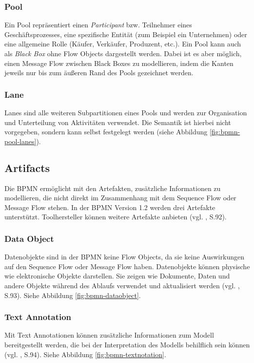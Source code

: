 \subsubsection{Pool}
Ein Pool repräsentiert einen \emph{Participant} bzw. Teilnehmer eines Geschäftsprozesses, eine spezifische Entität (zum Beispiel ein Unternehmen) oder eine allgemeine Rolle (Käufer, Verkäufer, Produzent, etc.). Ein Pool kann auch als \emph{Black Box} ohne Flow Objects dargestellt werden. Dabei ist es aber möglich, einen Message Flow zwischen Black Boxes zu modellieren, indem die Kanten jeweils nur bis zum äußeren Rand des Pools gezeichnet werden.

\subsubsection{Lane}
Lanes sind alle weiteren Subpartitionen eines Pools und werden zur Organisation und Unterteilung von Aktivitäten verwendet. Die Semantik ist hierbei nicht vorgegeben, sondern kann selbst festgelegt werden (siehe Abbildung \ref{fig:bpmn-pool-lanes}).

\subsection{Artifacts}
Die BPMN ermöglicht mit den Artefakten, zusätzliche Informationen zu modellieren, die nicht direkt im Zusammenhang mit dem Sequence Flow oder Message Flow stehen. In der BPMN Version 1.2 werden drei Artefakte unterstützt. Toolhersteller können weitere Artefakte anbieten (vgl. \citep{BPMN2009}, S.92).

\subsubsection{Data Object}
Datenobjekte sind in der BPMN keine Flow Objects, da sie keine Auswirkungen auf den Sequence Flow oder Message Flow haben. Datenobjekte können physische wie elektronische Objekte darstellen. Sie zeigen wie Dokumente, Daten und andere Objekte während des Ablaufs verwendet und aktualisiert werden (vgl. \citep{BPMN2009}, S.93). Siehe Abbildung \ref{fig:bpmn-dataobject}.


\subsubsection{Text Annotation}
Mit Text Annotationen können zusätzliche Informationen zum Modell bereitgestellt werden, die bei der Interpretation des Modells behilflich sein können (vgl. \citep{BPMN2009}, S.94). Siehe Abbildung \ref{fig:bpmn-textnotation}.

